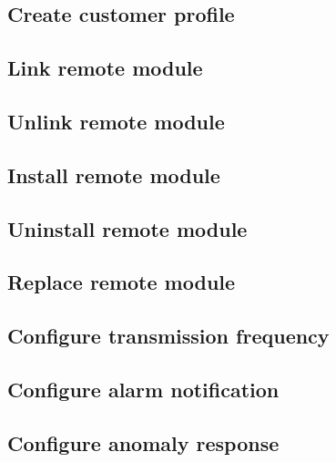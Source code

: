 \subsection{Create customer profile}
\label{uc:create-customer-profile}


\subsection{Link remote module}
\label{uc:link-remote-module}


\subsection{Unlink remote module}
\label{uc:unlink-remote-module}


\subsection{Install remote module}
\label{uc:install-remote-module}


\subsection{Uninstall remote module}
\label{uc:uninstall-remote-module}


\subsection{Replace remote module}
\label{uc:replace-remote-module}


\subsection{Configure transmission frequency}
\label{uc:configure-transmission-frequency}


\subsection{Configure alarm notification}
\label{uc:configure-alarm-notification}


\subsection{Configure anomaly response}
\label{uc:configure-anomaly-response}


